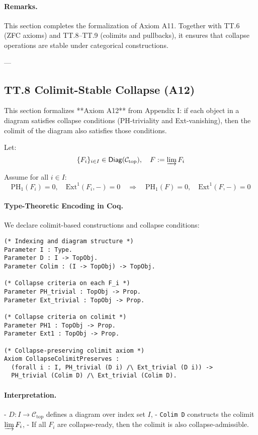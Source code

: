 \documentclass[11pt]{article}
\begin{document}
\paragraph{Remarks.}
This section completes the formalization of Axiom A11.  
Together with TT.6 (ZFC axioms) and TT.8–TT.9 (colimits and pullbacks), it ensures that collapse operations are stable under categorical constructions.

---

\subsection*{TT.8 Colimit-Stable Collapse (A12)}

This section formalizes **Axiom A12** from Appendix I:  
if each object in a diagram satisfies collapse conditions (PH-triviality and Ext-vanishing),  
then the colimit of the diagram also satisfies those conditions.

Let:
\[
\{ F_i \}_{i \in I} \in \mathsf{Diag}(\mathcal{C}_{\mathrm{top}}), \quad
F := \varinjlim F_i
\]

Assume for all \( i \in I \):
\[
\mathrm{PH}_1(F_i) = 0, \quad \mathrm{Ext}^1(F_i, -) = 0
\quad \Rightarrow \quad
\mathrm{PH}_1(F) = 0, \quad \mathrm{Ext}^1(F, -) = 0
\]

\paragraph{Type-Theoretic Encoding in Coq.}

We declare colimit-based constructions and collapse conditions:

\begin{lstlisting}[language=Coq]
(* Indexing and diagram structure *)
Parameter I : Type.
Parameter D : I -> TopObj.
Parameter Colim : (I -> TopObj) -> TopObj.

(* Collapse criteria on each F_i *)
Parameter PH_trivial : TopObj -> Prop.
Parameter Ext_trivial : TopObj -> Prop.

(* Collapse criteria on colimit *)
Parameter PH1 : TopObj -> Prop.
Parameter Ext1 : TopObj -> Prop.

(* Collapse-preserving colimit axiom *)
Axiom CollapseColimitPreserves :
  (forall i : I, PH_trivial (D i) /\ Ext_trivial (D i)) ->
  PH_trivial (Colim D) /\ Ext_trivial (Colim D).
\end{lstlisting}

\paragraph{Interpretation.}
- \( D : I \to \mathcal{C}_{\mathrm{top}} \) defines a diagram over index set \( I \),
- \texttt{Colim D} constructs the colimit \( \varinjlim F_i \),
- If all \( F_i \) are collapse-ready, then the colimit is also collapse-admissible.
\end{document}
